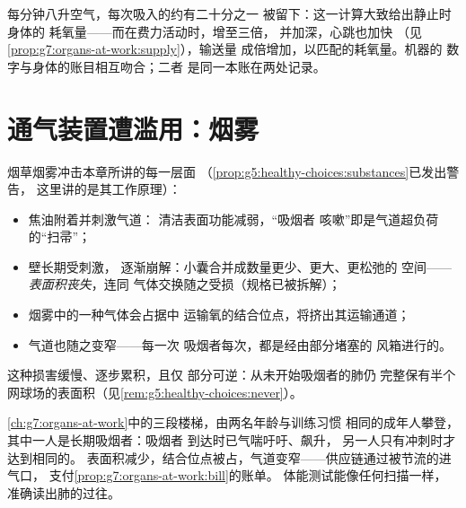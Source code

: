 \begin{example}[账目核对]\label{ex:g7:lungs-and-gas-exchange:accounting}
每分钟八升空气，每次吸入的约有二十分之一
被留下：这一计算大致给出静止时身体的
耗氧量——而在费力活动时，增至三倍，
并加深，心跳也加快
（见\cref{prop:g7:organs-at-work:supply}），输送量
成倍增加，以匹配的耗氧量。机器的
数字与身体的账目相互吻合；二者
是同一本账在两处记录。
\end{example}

\section{通气装置遭滥用：烟雾}

\begin{proposition}[烟雾对整套装置的影响]\label{prop:g7:lungs-and-gas-exchange:smoke}
烟草烟雾冲击本章所讲的每一层面
（\cref{prop:g5:healthy-choices:substances}已发出警告，
这里讲的是其工作原理）：
\begin{itemize}
  \item 焦油附着并刺激气道：
        清洁表面功能减弱，“吸烟者
        咳嗽”即是气道超负荷的“扫帚”；
  \item {}壁长期受刺激，
        逐渐崩解：小囊合并成数量更少、更大、更松弛的
        空间——\emph{表面积丧失}，连同
        气体交换随之受损（规格已被拆解）；
  \item 烟雾中的一种气体会占据中
        运输氧的结合位点，将挤出其运输通道；
  \item 气道也随之变窄——每一次
        吸烟者每次，都是经由部分堵塞的
        风箱进行的。
\end{itemize}
这种损害缓慢、逐步累积，且仅
部分可逆：从未开始吸烟者的肺仍
完整保有半个网球场的表面积（见\cref{rem:g5:healthy-choices:never}）。
\end{proposition}
\admitted

\begin{example}[两次爬楼梯测试]\label{ex:g7:lungs-and-gas-exchange:stairs}
\cref{ch:g7:organs-at-work}中的三段楼梯，由两名年龄与训练习惯
相同的成年人攀登，其中一人是长期吸烟者：吸烟者
到达时已气喘吁吁、飙升，
另一人只有冲刺时才达到相同的。
表面积减少，结合位点被占，气道变窄——供应链通过被节流的进气口，
支付\cref{prop:g7:organs-at-work:bill}的账单。
体能测试能像任何扫描一样，
准确读出肺的过往。
\end{example}

